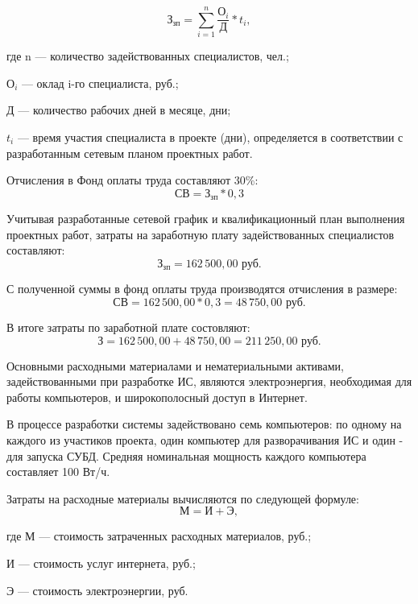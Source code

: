 			\begin{equation}\label{eq:salary_specialist}
				\text{З}_{\text{зп}} = \sum_{i=1}^{n} \frac{ \text{О}_i }{ \text{Д} } * t_i ,		
			\end{equation}
			\begin{ESKDexplanation}
				\item[где ] n --- количество задействованных специалистов, чел.;
				\item $\text{О}_i$ --- оклад i-го специалиста, руб.;
				\item $\text{Д}$ --- количество рабочих дней в месяце, дни;
				\item $t_i$ --- время участия специалиста в проекте (дни), определяется в соответствии с разработанным сетевым планом проектных работ.
			\end{ESKDexplanation}

			Отчисления в Фонд оплаты труда составляют 30\%:
			\begin{equation}\label{eq:royalty}
				\text{СВ} = \text{З}_{\text{зп}} * 0,3
			\end{equation}

			Учитывая разработанные сетевой график и квалификационный план выполнения проектных работ, затраты на заработную плату задействованных специалистов составляют:
			$$\text{З}_{\text{зп}} = 162\,500,00 \text{ руб.}$$

			С полученной суммы в фонд оплаты труда производятся отчисления в размере:
			$$\text{СВ} = 162\,500,00 * 0,3 = 48\,750,00 \text{ руб.}$$

			В итоге затраты по заработной плате состовляют:
			$$\text{З} = 162\,500,00 + 48\,750,00 = 211\,250,00 \text{ руб.}$$

			Основными расходными материалами и нематериальными активами, задействованными при разработке ИС, являются электроэнергия, необходимая для работы компьютеров, и широкополосный доступ в Интернет.

			В процессе разработки  системы задействовано семь компьютеров: по одному на каждого из участиков проекта, один компьютер для разворачивания ИС и один - для запуска СУБД. Средняя номинальная мощность каждого компьютера составляет 100 Вт/ч.

			Затраты на расходные материалы вычисляются по следующей формуле:
			\begin{equation}\label{eq:consumables}
				\text{М} = \text{И} + \text{Э},
			\end{equation}
			\begin{ESKDexplanation}
				\item[где ]$\text{М}$ --- стоимость затраченных расходных материалов, руб.;
				\item $\text{И}$ ---  стоимость услуг интернета, руб.;
				\item $\text{Э}$ ---  стоимость электроэнергии, руб.
			\end{ESKDexplanation}

